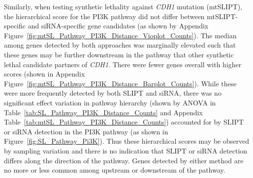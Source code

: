 Similarly, when testing synthetic lethality against \textit{CDH1} mutation (mtSLIPT), the hierarchical score for the \gls{PI3K} pathway did not differ between mtSLIPT-specific and siRNA-specific gene candidates (as shown by Appendix Figure~\ref{fig:mtSL_Pathway_PI3K_Distance_Vioplot_Counts}). The median among genes detected by both approaches was marginally elevated such that these genes may be further downstream in the pathway that other synthetic lethal candidate partners of \textit{CDH1}. There were fewer genes overall with higher scores (shown in Appendix Figure~\ref{fig:mtSL_Pathway_PI3K_Distance_Barplot_Counts}). While these were more frequently detected by both \gls{SLIPT} and siRNA, there was no significant effect variation in pathway hierarchy (shown by \gls{ANOVA} in Table~\ref{tab:SL_Pathway_PI3K_Distance_Counts} and Appendix Table~\ref{tab:mtSL_Pathway_PI3K_Distance_Counts}) accounted for by SLIPT or siRNA detection in the PI3K pathway (as shown in Figure~\ref{fig:SL_Pathway_Pi3K}). Thus these hierarchical scores may be observed by sampling variation and there is no indication that SLIPT or siRNA detection differs along the direction of the pathway. Genes detected by either method are no more or less common among upstream or downstream of the pathway.




\begin{table*}[!h]
\caption{\gls{ANOVA} for Synthetic Lethality and PI3K Hierarchy}
\label{tab:SL_Pathway_PI3K_Distance_Counts}
\noindent{}
\end{table*}

